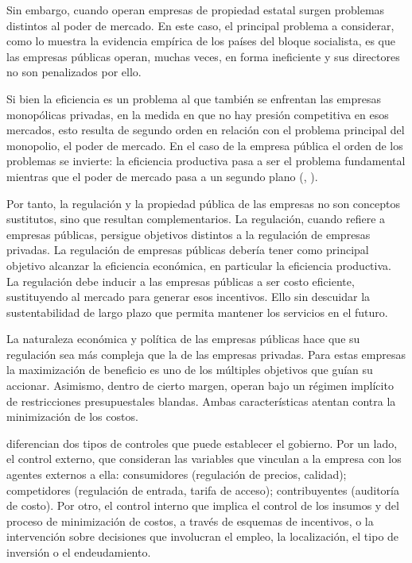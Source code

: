 \documentclass[
  12pt,
  spanish,
]{book}
\begin{document}
Sin embargo, cuando operan empresas de propiedad estatal surgen problemas distintos al poder de mercado. En este caso, el principal problema a considerar, como lo muestra la evidencia empírica de los países del bloque socialista, es que las empresas públicas operan, muchas veces, en forma ineficiente y sus directores no son penalizados por ello.

Si bien la eficiencia es un problema al que también se enfrentan las empresas monopólicas privadas, en la medida en que no hay presión competitiva en esos mercados, esto resulta de segundo orden en relación con el problema principal del monopolio, el poder de mercado. En el caso de la empresa pública el orden de los problemas se invierte: la eficiencia productiva pasa a ser el problema fundamental mientras que el poder de mercado pasa a un segundo plano (\citet{Roland2000}, \citet{WorldBank1995}).

Por tanto, la regulación y la propiedad pública de las empresas no son conceptos sustitutos, sino que resultan complementarios. La regulación, cuando refiere a empresas públicas, persigue objetivos distintos a la regulación de empresas privadas. La regulación de empresas públicas debería tener como principal objetivo alcanzar la eficiencia económica, en particular la eficiencia productiva. La regulación debe inducir a las empresas públicas a ser costo eficiente, sustituyendo al mercado para generar esos incentivos. Ello sin descuidar la sustentabilidad de largo plazo que permita mantener los servicios en el futuro.

La naturaleza económica y política de las empresas públicas hace que su regulación sea más compleja que la de las empresas privadas. Para estas empresas la maximización de beneficio es uno de los múltiples objetivos que guían su accionar. Asimismo, dentro de cierto margen, operan bajo un régimen implícito de restricciones presupuestales blandas. Ambas características atentan contra la minimización de los costos.

\citet{Laffont1993} diferencian dos tipos de controles que puede establecer el gobierno. Por un lado, el control externo, que consideran las variables que vinculan a la empresa con los agentes externos a ella: consumidores (regulación de precios, calidad); competidores (regulación de entrada, tarifa de acceso); contribuyentes (auditoría de costo). Por otro, el control interno que implica el control de los insumos y del proceso de minimización de costos, a través de esquemas de incentivos, o la intervención sobre decisiones que involucran el empleo, la localización, el tipo de inversión o el endeudamiento.
\end{document}
